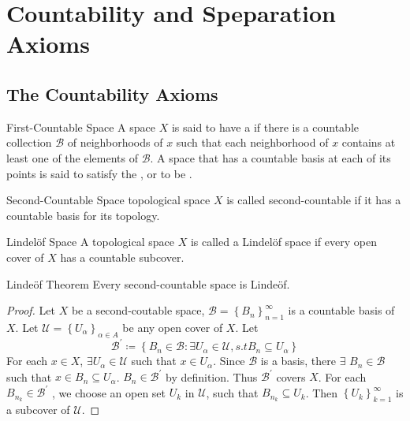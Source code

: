 \documentclass[../main.tex]{subfiles}
\begin{document}
\ifSubfilesClassLoaded{

    \tableofcontents
    
}{}

\chapter{ Countability and Speparation Axioms}
\section{The Countability Axioms}

\begin{definition}{First-Countable Space}{}
A space $X$ is said to have a  if there is a countable collection $\mathcal{B}$ of neighborhoods of $x$ such that each neighborhood of $x$ contains at least one of the elements of $\mathcal{B}$. A space that has a countable basis at each of its points is said to satisfy the , or to be .
\end{definition}

\begin{definition}{Second-Countable Space}{}
     topological space $X$ is called second-countable if it has a countable basis for its topology. 
\end{definition}

\begin{definition}{Lindel\"of Space}{}
 A topological space $X$ is called a Lindelöf space if every open cover of $X$ has a countable subcover.
\end{definition}

\begin{theorem}{Linde\"of Theorem}{}
    Every second-countable space is Linde\"of.
\end{theorem}
\begin{proof}

    Let \(  X  \) be a second-coutable space, \(  \mathcal{B}= \left\{ B_{n} \right\}_{n = 1}^{\infty}  \) is a countable basis of \(  X  \). Let \(  \mathcal{U}= \left\{ U_{\alpha } \right\}_{\alpha \in A}  \) be any open cover of \(  X  \).     
  Let \[
  \mathcal{B}^{\prime} \coloneqq \left\{ B_{n}\in \mathcal{B}: \exists U_{\alpha }\in \mathcal{U}, s.t B_{n}\subseteq U_{\alpha } \right\}
  \] For each \(  x \in X  \),  \(  \exists U_{\alpha }\in \mathcal{U}  \) such that \(  x \in U_{\alpha }  \). Since \(  \mathcal{B}  \) is a basis, there \(  \exists   \) \(  B_{n}\in \mathcal{B}  \)       such that \(  x \in B_{n}\subseteq U_{\alpha }  \). \(  B_{n}\in \mathcal{B}^{\prime}   \) by definition. Thus \(  \mathcal{B}^{\prime}   \) covers \(  X  \). For each \(  B_{n_{k}}\in \mathcal{B}^{\prime}   \)     , we choose an open set \(  U_{k}  \) in \(  \mathcal{U}  \), such that \(  B_{n_{k}}\subseteq U_{k}  \). Then \(  \left\{ U_{k} \right\}_{k= 1}^{\infty}  \) is a subcover of \(  \mathcal{U}  \).     
\end{proof}
\end{document}
